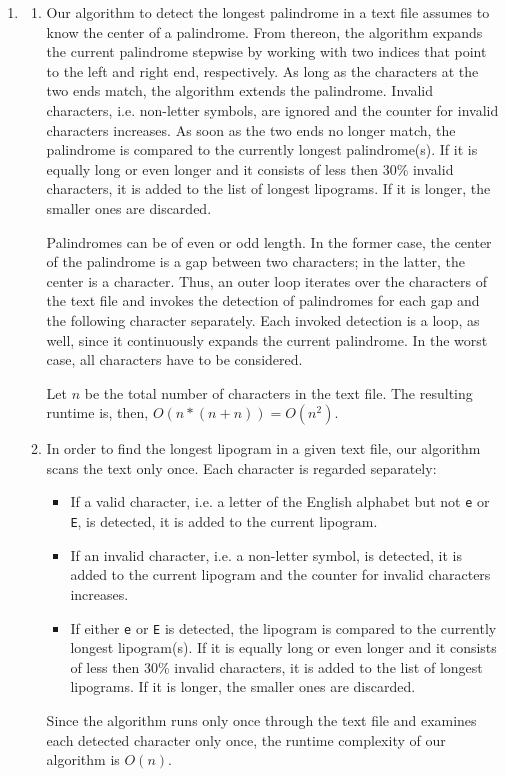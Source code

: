 \documentclass[a4paper,11pt,oneside]{book}
\begin{document}
\begin{enumerate}
	\item	\begin{enumerate}
					\item Our algorithm to detect the longest palindrome in a text file assumes to know the center of a palindrome. From thereon, the algorithm expands the current palindrome stepwise by working with two indices that point to the left and right end, respectively. As long as the characters at the two ends match, the algorithm extends the palindrome. Invalid characters, i.e. non-letter symbols, are ignored and the counter for invalid characters increases. As soon as the two ends no longer match, the palindrome is compared to the currently longest palindrome(s). If it is equally long or even longer and it consists of less then 30\% invalid characters, it is added to the list of longest lipograms. If it is longer, the smaller ones are discarded.
					
					Palindromes can be of even or odd length. In the former case, the center of the palindrome is a gap between two characters; in the latter, the center is a character. Thus, an outer loop iterates over the characters of the text file and invokes the detection of palindromes for each gap and the following character separately. Each invoked detection is a loop, as well, since it continuously expands the current palindrome. In the worst case, all characters have to be considered. 
					
					Let $n$ be the total number of characters in the text file. The resulting runtime is, then, $O(n*(n+n))=O(n^2)$. 
					\item In order to find the longest lipogram in a given text file, our algorithm scans the text only once. Each character is regarded separately: \begin{itemize}
							\item If a valid character, i.e. a letter of the English alphabet but not \texttt{e} or \texttt{E}, is detected, it is added to the current lipogram.
							\item If an invalid character, i.e. a non-letter symbol, is detected, it is added to the current lipogram and the counter for invalid characters increases.
							\item If either \texttt{e} or \texttt{E} is detected, the lipogram is compared to the currently longest lipogram(s). If it is equally long or even longer and it consists of less then 30\% invalid characters, it is added to the list of longest lipograms. If it is longer, the smaller ones are discarded.
						\end{itemize}
						Since the algorithm runs only once through the text file and examines each detected character only once, the runtime complexity of our algorithm is $O(n)$.
				\end{enumerate}
\end{enumerate}


\end{document}
